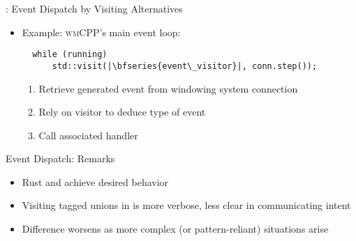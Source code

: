 \begin{frame}[fragile]{\underline{\cpp}: Event Dispatch by Visiting Alternatives \hfill {\footnotesize \currentname}}


    \begin{itemize}

        \item Example: \textsc{wmCPP}'s main event loop:\\
\begin{verbatim}
  while (running)
      std::visit(|\bfseries{event\_visitor}|, conn.step());
\end{verbatim}

    \vspace*{5pt}\begin{enumerate}

        \item Retrieve generated event from windowing system connection

        \item Rely on visitor to deduce type of event

        \item Call associated handler

    \end{enumerate}

    \end{itemize}

    \vfill

\end{frame}

\begin{frame}[fragile]{Event Dispatch: Remarks \hfill {\footnotesize \currentname}}

    \begin{itemize}

        \item Rust and \cpp achieve desired behavior

        \item Visiting tagged unions in \cpp is more verbose, less clear in communicating intent

        \item Difference worsens as more complex (or pattern-reliant) situations arise

    \end{itemize}

    \vfill

\end{frame}
